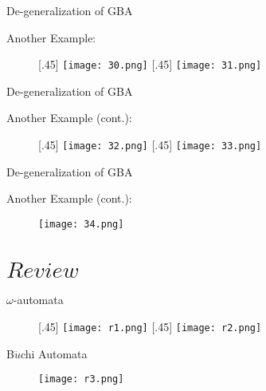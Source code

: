 \documentclass[17pt, t, lualatex]{beamer}
\begin{document}
\begin{frame}{De-generalization of GBA}
\begin{block}{Another Example:}
    \begin{figure}[ht]
        [.45\linewidth]{%
        \texttt{[image: 30.png]}%
    }%
    \hfill
        [.45\linewidth]{%
        \texttt{[image: 31.png]}%
    }
\end{figure}
\end{block}
\end{frame}

\begin{frame}{De-generalization of GBA}
\begin{block}{Another Example (cont.):}
    \begin{figure}[ht]
        [.45\linewidth]{%
        \texttt{[image: 32.png]}%
    }%
    \hfill
        [.45\linewidth]{%
        \texttt{[image: 33.png]}%
    }
\end{figure}
\end{block}
\end{frame}

\begin{frame}{De-generalization of GBA}
\begin{block}{Another Example (cont.):}
    \begin{figure}
        \centering
        \texttt{[image: 34.png]}
    \end{figure}
\end{block}
\end{frame}

\section{$Review$}

\insertsectionpage

\begin{frame}{$\omega$-automata}
    \begin{figure}[ht]
        \subcaptionbox*{}[.45\linewidth]{%
        \texttt{[image: r1.png]}%
    }%
    \hfill
        \subcaptionbox*{}[.45\linewidth]{%
        \texttt{[image: r2.png]}%
    }
\end{figure}
\end{frame}

\begin{frame}{B$\ddot{u}$chi Automata}
    \begin{figure}
        \centering
        \texttt{[image: r3.png]}
    \end{figure}
\end{frame}
\end{document}

